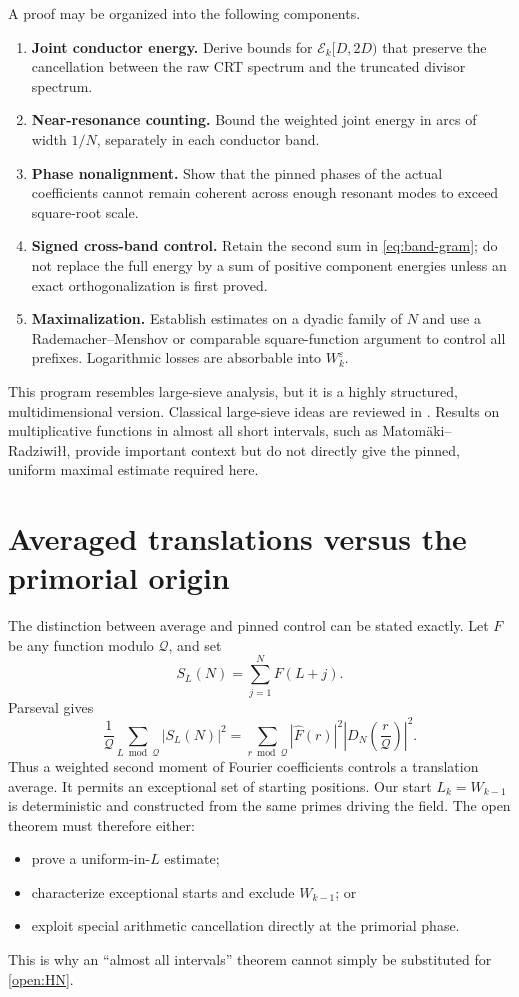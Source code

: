 \documentclass[11pt]{article}
\theoremstyle{definition}
\begin{document}
A proof may be organized into the following components.
\begin{enumerate}
\item \textbf{Joint conductor energy.}  Derive bounds for $\mathcal E_k[D,2D)$ that preserve the cancellation between the raw CRT spectrum and the truncated divisor spectrum.
\item \textbf{Near-resonance counting.}  Bound the weighted joint energy in arcs of width $1/N$, separately in each conductor band.
\item \textbf{Phase nonalignment.}  Show that the pinned phases of the actual coefficients cannot remain coherent across enough resonant modes to exceed square-root scale.
\item \textbf{Signed cross-band control.}  Retain the second sum in \eqref{eq:band-gram}; do not replace the full energy by a sum of positive component energies unless an exact orthogonalization is first proved.
\item \textbf{Maximalization.}  Establish estimates on a dyadic family of $N$ and use a Rademacher--Menshov or comparable square-function argument to control all prefixes.  Logarithmic losses are absorbable into $W_k^{\varepsilon}$.
\end{enumerate}

This program resembles large-sieve analysis, but it is a highly structured, multidimensional version.  Classical large-sieve ideas are reviewed in \cite{MontgomeryVaughan}.  Results on multiplicative functions in almost all short intervals, such as Matom\"aki--Radziwi\l\l \cite{MatomakiRadziwill}, provide important context but do not directly give the pinned, uniform maximal estimate required here.

\section{Averaged translations versus the primorial origin}

The distinction between average and pinned control can be stated exactly.  Let $F$ be any function modulo $\mathcal Q$, and set
\[
S_L(N)=\sum_{j=1}^{N}F(L+j).
\]
Parseval gives
\begin{equation}\label{eq:averaged-start}
\frac1{\mathcal Q}\sum_{L\bmod\mathcal Q}|S_L(N)|^2
=
\sum_{r\bmod\mathcal Q}|\widehat F(r)|^2
\left|D_N\!\left(\frac r{\mathcal Q}\right)\right|^2.
\end{equation}
Thus a weighted second moment of Fourier coefficients controls a translation average.  It permits an exceptional set of starting positions.  Our start $L_k=W_{k-1}$ is deterministic and constructed from the same primes driving the field.  The open theorem must therefore either:
\begin{itemize}
\item prove a uniform-in-$L$ estimate;
\item characterize exceptional starts and exclude $W_{k-1}$; or
\item exploit special arithmetic cancellation directly at the primorial phase.
\end{itemize}
This is why an ``almost all intervals'' theorem cannot simply be substituted for \cref{open:HN}.
\end{document}
